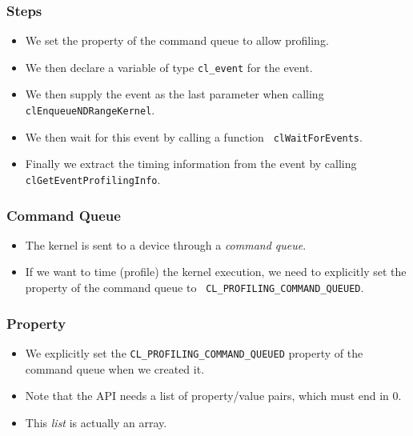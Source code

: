 \documentclass{beamer}
\begin{document}
\begin{frame}
  \frametitle{Steps}
  \begin{itemize}
    \item We set the property of the command queue to allow profiling.
    \item We then declare a variable of type {\tt cl\_event} for
      the event.
    \item We then supply the event as the last parameter when calling
      {\tt clEnqueueNDRangeKernel}.
    \item We then wait for this event by calling a function {\tt
      clWaitForEvents}.
    \item Finally we extract the timing information from the event by
      calling {\tt clGetEventProfilingInfo}.
  \end{itemize}
\end{frame}

\begin{frame}
  \frametitle{Command Queue}
  \begin{itemize}
    \item The kernel is sent to a device through a {\em command
      queue}.
    \item If we want to time (profile) the kernel execution, we need
      to explicitly set the property of the command queue to {\tt
        CL\_PROFILING\_COMMAND\_QUEUED}.  
  \end{itemize}
\end{frame}

\begin{frame}
\end{frame}

\begin{frame}
  \frametitle{Property}
  \begin{itemize}
    \item We explicitly set the {\tt CL\_PROFILING\_COMMAND\_QUEUED}
      property of the command queue when we created it.
    \item Note that the API needs a list of property/value pairs, which must end in 0.
    \item This {\em list} is actually an array.
  \end{itemize}
\end{frame}

\begin{frame}
\end{frame}
\end{document}
